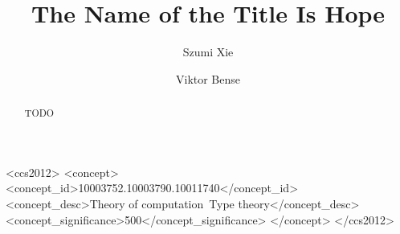 \documentclass[sigplan, screen, review]{acmart}
\begin{document}
\title{The Name of the Title Is Hope}

\author{Szumi Xie}

\author{Viktor Bense}


\begin{abstract}
  TODO
\end{abstract}

\begin{CCSXML}
  <ccs2012>
  <concept>
  <concept_id>10003752.10003790.10011740</concept_id>
  <concept_desc>Theory of computation~Type theory</concept_desc>
  <concept_significance>500</concept_significance>
  </concept>
  </ccs2012>
\end{CCSXML}


\end{document}
